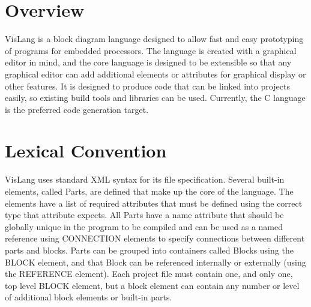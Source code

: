 \section{Overview}
VisLang is a block diagram language designed to allow fast and easy prototyping of programs for embedded processors.
The language is created with a graphical editor in mind, and the core language is designed to be extensible so that any graphical editor can add additional elements or attributes for graphical display or other features.
It is designed to produce code that can be linked into projects easily, so existing build tools and libraries can be used.
Currently, the C language is the preferred code generation target.
\section{Lexical Convention}
VisLang uses standard XML syntax for its file specification.
Several built-in elements, called Parts, are defined that make up the core of the language.
The elements have a list of required attributes that must be defined using the correct type that attribute expects.
 All Parts have a name attribute that should be globally unique in the program to be compiled and can be used as a named reference using CONNECTION elements to specify connections between different parts and blocks.
Parts can be grouped into containers called Blocks using the BLOCK element, and that Block can be referenced internally or externally (using the REFERENCE element).
Each project file must contain one, and only one, top level BLOCK element, but a block element can contain any number or level of additional block elements or built-in parts.
